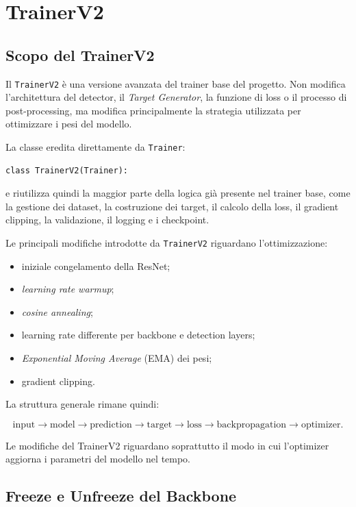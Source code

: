 \section{TrainerV2}

\subsection{Scopo del TrainerV2}

Il \texttt{TrainerV2} è una versione avanzata del trainer base del progetto.
Non modifica l'architettura del detector, il \textit{Target Generator}, la
funzione di loss o il processo di post-processing, ma modifica principalmente
la strategia utilizzata per ottimizzare i pesi del modello.

La classe eredita direttamente da \texttt{Trainer}:

\begin{verbatim}
class TrainerV2(Trainer):
\end{verbatim}

e riutilizza quindi la maggior parte della logica già presente nel trainer
base, come la gestione dei dataset, la costruzione dei target, il calcolo della
loss, il gradient clipping, la validazione, il logging e i checkpoint.

Le principali modifiche introdotte da \texttt{TrainerV2} riguardano
l'ottimizzazione:

\begin{itemize}
    \item iniziale congelamento della ResNet;
    \item \textit{learning rate warmup};
    \item \textit{cosine annealing};
    \item learning rate differente per backbone e detection layers;
    \item \textit{Exponential Moving Average} (EMA) dei pesi;
    \item gradient clipping.
\end{itemize}

La struttura generale rimane quindi:

\[
\text{input}
\rightarrow
\text{model}
\rightarrow
\text{prediction}
\rightarrow
\text{target}
\rightarrow
\text{loss}
\rightarrow
\text{backpropagation}
\rightarrow
\text{optimizer}.
\]

Le modifiche del TrainerV2 riguardano soprattutto il modo in cui
l'optimizer aggiorna i parametri del modello nel tempo.

\subsection{Freeze e Unfreeze del Backbone}

